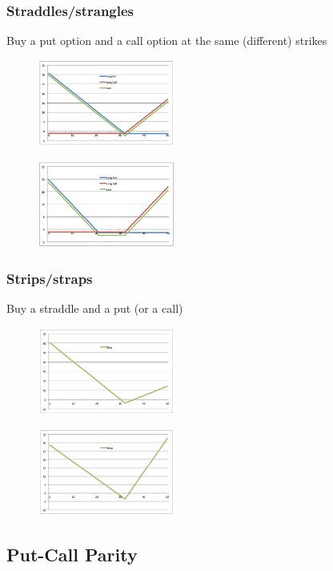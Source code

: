 \begin{multicols}{2}
\subsubsection{Straddles/strangles}
Buy a put option and a call option at the same (different) strikes
\begin{figure}[H]
    \centering 
    \includegraphics[width =0.4\textwidth]{Figure/straddle.png}
\end{figure}

\begin{figure}[H]
    \centering 
    \includegraphics[width =0.4\textwidth]{Figure/strangle.png}
\end{figure}

\subsubsection{Strips/straps}
Buy a straddle and a put (or a call)
\begin{figure}[H]
    \centering 
    \includegraphics[width =0.4\textwidth]{Figure/strip.png}
\end{figure}

\begin{figure}[H]
    \centering 
    \includegraphics[width =0.4\textwidth]{Figure/strap.png}
\end{figure}



\subsection{Put-Call Parity}




\end{multicols}
